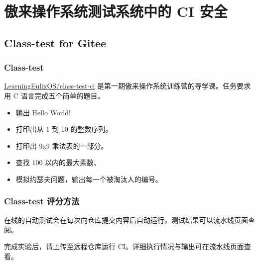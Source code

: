 \documentclass[xcolor=table,dvipsnames,svgnames,aspectratio=169]{ctexbeamer}
\begin{document}
\section{傲来操作系统测试系统中的 CI 安全}

\subsection{Class-test for Gitee}

\begin{frame}
  \frametitle{Class-test}

  \href{https://gitee.com/LearningEulixOS/class-test-ci}{LearningEulixOS/class-test-ci} 是第一期傲来操作系统训练营的导学课。任务要求用 C 语言完成五个简单的题目。

  \begin{itemize}
    \item 输出 Hello World!
    \item 打印出从 1 到 10 的整数序列。
    \item 打印出 9x9 乘法表的一部分。
    \item 查找 100 以内的最大素数、
    \item 模拟约瑟夫问题，输出每一个被淘汰人的编号。
  \end{itemize}
\end{frame}

\begin{frame}
  \frametitle{Class-test 评分方法}

  在线的自动测试会在每次向仓库提交内容后自动运行，测试结果可以流水线页面查阅。

  完成实验后，请上传至远程仓库运行 CI。详细执行情况与输出可在流水线页面查看。
\end{frame}



\end{document}
